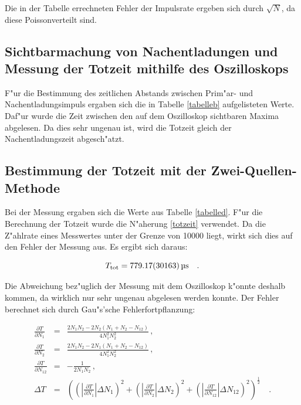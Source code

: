 	Die in der Tabelle errechneten Fehler der Impulsrate ergeben sich durch $\sqrt{N}$, da diese Poissonverteilt sind.

	\subsection{Sichtbarmachung von Nachentladungen und Messung der Totzeit mithilfe des Oszilloskops} %
	 \label{sub:sichtbarmachung_von_nachentladungen}

	
	
	F"ur die Bestimmung des zeitlichen Abstands zwischen Prim"ar- und Nachentladungsimpuls ergaben sich die in Tabelle \ref{tabelleb} aufgelisteten Werte. Daf"ur wurde die Zeit zwischen den auf dem Oszilloskop sichtbaren Maxima abgelesen.
	Da dies sehr ungenau ist, wird die Totzeit gleich der Nachentladungszeit abgesch"atzt.

	\subsection{Bestimmung der Totzeit mit der Zwei-Quellen-Methode} %
	\label{sub:bestimmung_der_totzeit_mit_der_zwei_quellen_methode}
	
	

	Bei der Messung ergaben sich die Werte aus Tabelle \ref{tabelled}.
	F"ur die Berechnung der Totzeit wurde die N"aherung \eqref{totzeit} verwendet. Da die Z"ahlrate eines Messwertes unter der Grenze von 10000 liegt, wirkt sich dies auf den Fehler der Messung aus.
	Es ergibt sich daraus:

	\begin{equation*}
		T_\mathrm{tot} = \SI{779.17 (30163)}{\micro\second} \quad .
	\end{equation*}

	Die Abweichung bez"uglich der Messung mit dem Oszilloskop k"onnte deshalb kommen, da wirklich nur sehr ungenau abgelesen werden konnte.
	Der Fehler berechnet sich durch Gau"s'sche Fehlerfortpflanzung:

	\begin{eqnarray*}
		\frac{\partial T}{\partial N_\mathrm{1}} &=& \frac{2 N_\mathrm{1}N_\mathrm{2} - 2 N_\mathrm{2}(N_\mathrm{1} + N_\mathrm{2} - N_\mathrm{12})}{4N_\mathrm{1}^2N_\mathrm{2}^2} \, , \\
		\frac{\partial T}{\partial N_\mathrm{2}} &=& \frac{2 N_\mathrm{1}N_\mathrm{2} - 2 N_\mathrm{1}(N_\mathrm{1} + N_\mathrm{2} - N_\mathrm{12})}{4N_\mathrm{1}^2N_\mathrm{2}^2} \, ,\\
		\frac{\partial T}{\partial N_\mathrm{12}} &=& -\frac{1}{2 N_\mathrm{1} N_\mathrm{2}} \, ,\\
		\Delta T &=& \left( \left( |\frac{\partial T}{\partial N_\mathrm{1}}| \Delta N_\mathrm{1} \right)^2 + \left( |\frac{\partial T}{\partial N_\mathrm{2}}| \Delta N_\mathrm{2} \right)^2 + \left( |\frac{\partial T}{\partial N_\mathrm{12}}| \Delta N_\mathrm{12} \right)^2 \right)^\frac{1}{2} \quad .
	\end{eqnarray*}


